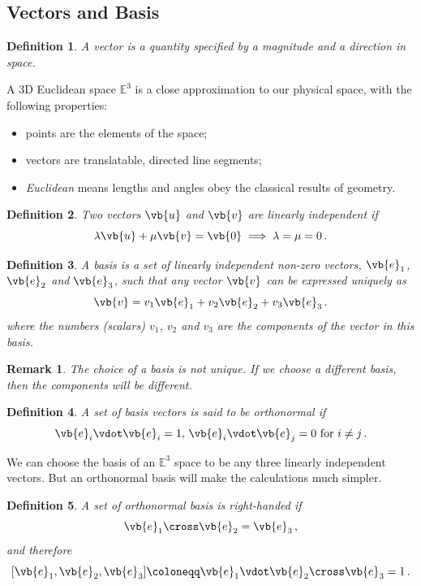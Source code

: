 \documentclass{article}
\theoremstyle{plain}\theoremheaderfont{\normalfont\itshape}\theorembodyfont{\rmfamily}\theoremseparator{.}\newtheorem*{rem}{Remark}\newtheorem*{ex}{Example}\newtheorem*{proof}{Proof}\newtheorem*{altp}{Alternative proof}
\theoremstyle{plain}\theoremheaderfont{\normalfont\bfseries}\theorembodyfont{\rmfamily}\theoremseparator{.}\newtheorem{thm}{Theorem}[section]\newtheorem{lem}[thm]{Lemma}\newtheorem{prop}[thm]{Proposition}\newtheorem*{cor}{Corollary}\newtheorem{defn}[thm]{Definition}\newtheorem{clm}[thm]{Claim}\newtheorem{clminproof}{Claim}
\theoremstyle{break}\theoremheaderfont{\normalfont\itshape}\theorembodyfont{\rmfamily}\theoremseparator{.\medskip}\newtheorem*{proofskip}{Proof}\newtheorem*{exs}{Examples}\newtheorem*{rems}{Remarks}
\theoremstyle{break}\theoremheaderfont{\normalfont\bfseries}\theorembodyfont{\rmfamily}\theoremseparator{.\medskip}\newtheorem{lemskip}[thm]{Lemma}\newtheorem{defnskip}[thm]{Definition}\newtheorem{propskip}[thm]{Proposition}\newtheorem{thmskip}[thm]{Theorem}
\numberwithin{equation}{section}
\begin{document}
	\subsection{Vectors and Basis}
	\begin{defn}
		A \textit{vector} is a quantity specified by a magnitude and a direction in space.
	\end{defn}
	A 3D Euclidean space \(\mathbb{E}^3\) is a close approximation to our physical space, with the following properties:
	\begin{itemize}[topsep=0pt]
		\item points are the elements of the space;
		\item vectors are translatable, directed line segments;
		\item \textit{Euclidean} means lengths and angles obey the classical results of geometry.
	\end{itemize}
	\begin{defn}
		Two vectors \(\vb{u}\) and \(\vb{v}\) are \textit{linearly independent} if
		\[\lambda\vb{u}+\mu\vb{v}=\vb{0}\implies\lambda=\mu=0\,.\]
	\end{defn}
	\begin{defn}
		A \textit{basis} is a set of linearly independent non-zero vectors, \(\vb{e}_1\), \(\vb{e}_2\) and \(\vb{e}_3\), such that any vector \(\vb{v}\) can be expressed uniquely as
		\[\vb{v}=v_1\vb{e}_1+v_2\vb{e}_2+v_3\vb{e}_3\,.\]
		where the numbers (scalars) \(v_1\), \(v_2\) and \(v_3\) are the \textit{components} of the vector in this basis.
	\end{defn}

	\begin{rem}
		The choice of a basis is not unique. If we choose a different basis, then the components will be different.
	\end{rem}
	
	\begin{defn}
		A set of basis vectors is said to be \textit{orthonormal} if 
		\[\vb{e}_i\vdot\vb{e}_i=1,\, \vb{e}_i\vdot\vb{e}_j=0 \text{ for } i\ne j\,.\]
	\end{defn}
	We can choose the basis of an \(\mathbb{E}^3\) space to be any three linearly independent vectors. But an orthonormal basis will make the calculations much simpler.
	\begin{defn}
		A set of orthonormal basis is \textit{right-handed} if
		\[\vb{e}_1\cross\vb{e}_2=\vb{e}_3\,,\]
		and therefore
		\[[\vb{e}_1,\vb{e}_2,\vb{e}_3]\coloneqq\vb{e}_1\vdot\vb{e}_2\cross\vb{e}_3=1\,.\]
	\end{defn}
	
\end{document}
